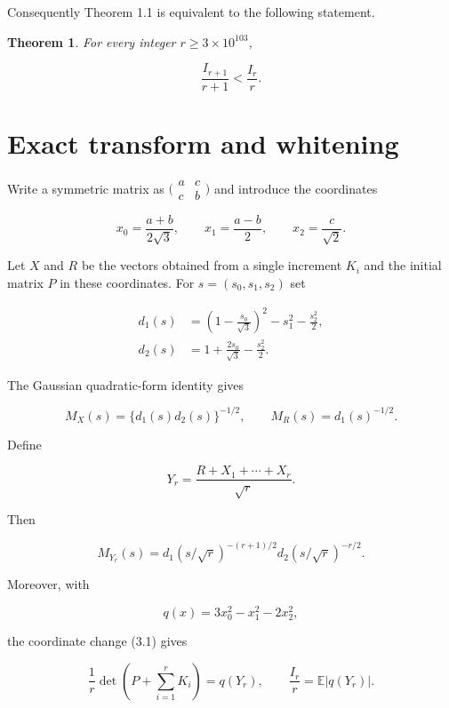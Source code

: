 \documentclass[11pt]{article}
\newtheorem{theorem}{Theorem}[section]
\begin{document}
Consequently Theorem 1.1 is equivalent to the following statement.

\begin{theorem}
For every integer $r\ge3\times10^{103}$,

\[
\frac{I_{r+1}}{r+1}<\frac{I_r}{r}.                       \tag{2.9}
\]

\end{theorem}

\section{Exact transform and whitening}

Write a symmetric matrix as $\bigl(\begin{smallmatrix}a&c\\c&b\end{smallmatrix}\bigr)$ and introduce the coordinates

\[
x_0=\frac{a+b}{2\sqrt3},\qquad
x_1=\frac{a-b}{2},\qquad
x_2=\frac c{\sqrt2}.                                    \tag{3.1}
\]

Let $X$ and $R$ be the vectors obtained from a single increment $K_i$ and the initial matrix $P$ in these coordinates.  For $s=(s_0,s_1,s_2)$ set

\[
\begin{aligned}
d_1(s)&=\left(1-\frac{s_0}{\sqrt3}\right)^2-s_1^2-\frac{s_2^2}{2},\\
d_2(s)&=1+\frac{2s_0}{\sqrt3}-\frac{s_2^2}{2}.
\end{aligned}                                            \tag{3.2}
\]

The Gaussian quadratic-form identity gives

\[
M_X(s)=\{d_1(s)d_2(s)\}^{-1/2},\qquad
M_R(s)=d_1(s)^{-1/2}.                                    \tag{3.3}
\]

Define

\[
Y_r=\frac{R+X_1+\cdots+X_r}{\sqrt r}.
\]

Then

\[
M_{Y_r}(s)=d_1(s/\sqrt r)^{-(r+1)/2}
d_2(s/\sqrt r)^{-r/2}.                                  \tag{3.4}
\]

Moreover, with

\[
q(x)=3x_0^2-x_1^2-2x_2^2,
\]

the coordinate change (3.1) gives

\[
\frac1r\det\left(P+\sum_{i=1}^rK_i\right)=q(Y_r),
\qquad
\frac{I_r}{r}=\mathbb E|q(Y_r)|.                        \tag{3.5}
\]
\end{document}
